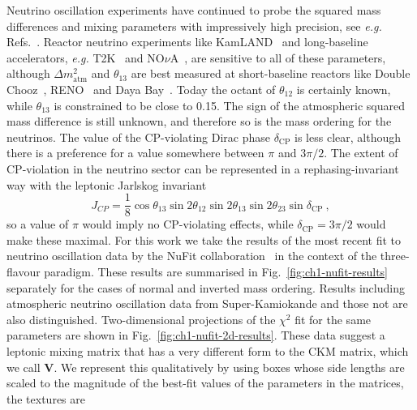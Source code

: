   Neutrino oscillation experiments have continued to probe the squared mass
  differences and mixing parameters with impressively high precision, see
  \textit{e.g.} Refs.~\cite{Capozzi:2017ipn, Esteban:2020cvm}. Reactor neutrino
  experiments like KamLAND~\cite{Eguchi:2002dm} and long-baseline accelerators,
  \textit{e.g.} T2K~\cite{Abe:2015awa} and NO$\nu$A~\cite{Adamson:2017qqn}, are
  sensitive to all of these parameters, although $\Delta m^{2}_{\text{atm}}$ and
  $\theta_{13}$ are best measured at short-baseline reactors like Double
  Chooz~\cite{Ardellier:2006mn}, RENO~\cite{Ahn:2010vy} and Daya
  Bay~\cite{An:2015qga}. Today the octant of $\theta_{12}$ is certainly known,
  while $\theta_{13}$ is constrained to be close to 0.15. The sign of the
  atmospheric squared mass difference is still unknown, and therefore so is the
  mass ordering for the neutrinos. The value of the CP-violating Dirac phase
  $\delta_{\text{CP}}$ is less clear, although there is a preference for a value
  somewhere between $\pi$ and $3\pi/2$. The extent of CP-violation in the
  neutrino sector can be represented in a rephasing-invariant way with the
  leptonic Jarlskog invariant
  \begin{equation}
    J_{CP} = \frac{1}{8} \cos \theta_{13} \sin 2\theta_{12} \sin 2\theta_{13} \sin 2\theta_{23} \sin \delta_{\text{CP}} \ ,
  \end{equation}
  so a value of $\pi$ would imply no CP-violating effects, while
  $\delta_{\text{CP}} = 3\pi/2$ would make these maximal. For this work we take
  the results of the most recent fit to neutrino oscillation data by the NuFit
  collaboration~\cite{Esteban:2020cvm, nufitweb} in the context of the
  three-flavour paradigm. These results are summarised in
  Fig.~\ref{fig:ch1-nufit-results} separately for the cases of normal and inverted
  mass ordering. Results including atmospheric neutrino oscillation data from
  Super-Kamiokande and those not are also distinguished. Two-dimensional
  projections of the $\chi^{2}$ fit for the same parameters are shown in
  Fig.~\ref{fig:ch1-nufit-2d-results}. These data suggest a leptonic mixing matrix
  that has a very different form to the CKM matrix, which we call $\mathbf{V}$.
  We represent this qualitatively by using boxes whose side lengths are scaled
  to the magnitude of the best-fit values of the parameters in the matrices, the
  textures are
